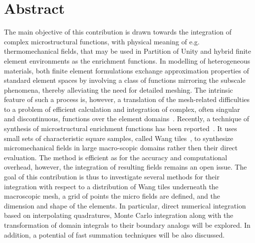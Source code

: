 \documentclass[article, A4, 11pt]{llncs}%
\begin{document}
\section*{Abstract}
The main objective of this contribution is drawn towards the integration of complex microstructural functions, with physical meaning of e.g. thermomechanical fields, that may be used in Partition of Unity and hybrid finite element environments as the enrichment functions. In modelling of heterogeneous materials, both finite element formulations exchange approximation properties of standard element spaces by involving a class of functions mirroring the subscale phenomena, thereby alleviating the need for detailed meshing. The intrinsic feature of such a process is, however, a translation of the mesh-related difficulties to a problem of efficient calculation and integration of complex, often singular and discontinuous, functions over the element domains~\cite{Novak:CMAME:2012}. Recently, a technique of synthesis of microstructural enrichment functions has been reported~\cite{Novak:PRE:2012,Novak:MSMSE:2012}. It uses small sets of characteristic square samples, called Wang tiles~\cite{Wang:BSTJ:1961}, to synthesize micromechanical fields in large macro-scopic domains rather then their direct evaluation. The method is efficient as for the accuracy and computational overhead, however, the integration of resulting fields remains an open issue. The goal of this contribution is thus to investigate several methods for their integration with respect to a distribution of Wang tiles underneath the macroscopic mesh, a grid of points the micro fields are defined, and the dimension and shape of the elements. In particular, direct numerical integration based on interpolating quadratures, Monte Carlo integration along with the transformation of domain integrals to their boundary analogs will be explored. In addition, a potential of fast summation techniques will be also discussed.
\end{document}
